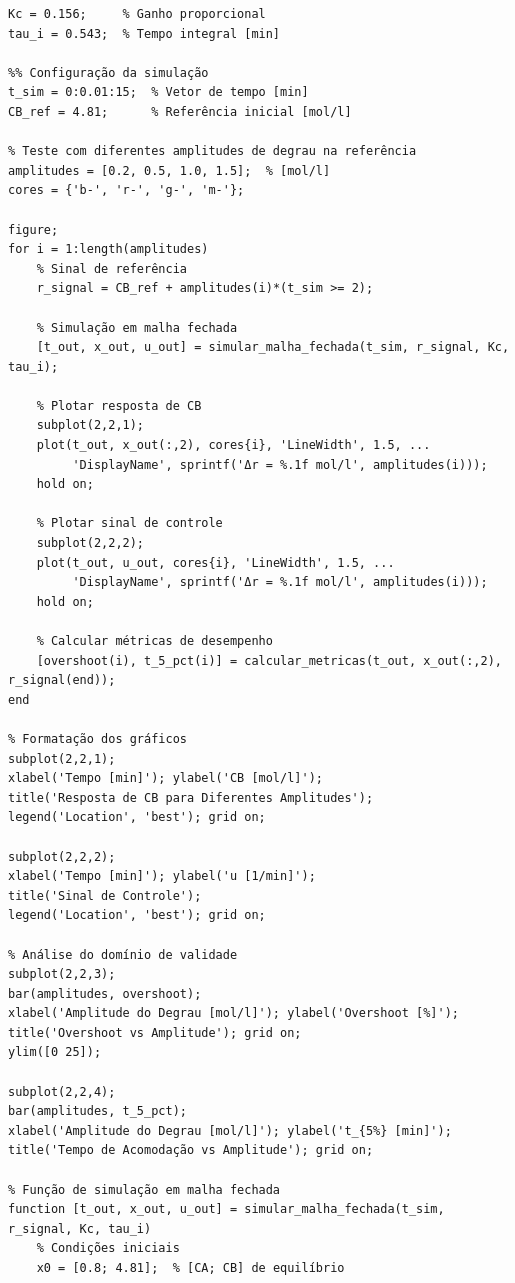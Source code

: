 \documentclass[a4paper,12pt]{article}
\begin{document}
\begin{lstlisting}[caption=Simulação do controle PI em sistema não linear]
%% Parâmetros do controlador PI projetado
Kc = 0.156;     % Ganho proporcional
tau_i = 0.543;  % Tempo integral [min]

%% Configuração da simulação
t_sim = 0:0.01:15;  % Vetor de tempo [min]
CB_ref = 4.81;      % Referência inicial [mol/l]

% Teste com diferentes amplitudes de degrau na referência
amplitudes = [0.2, 0.5, 1.0, 1.5];  % [mol/l]
cores = {'b-', 'r-', 'g-', 'm-'};

figure;
for i = 1:length(amplitudes)
    % Sinal de referência
    r_signal = CB_ref + amplitudes(i)*(t_sim >= 2);
    
    % Simulação em malha fechada
    [t_out, x_out, u_out] = simular_malha_fechada(t_sim, r_signal, Kc, tau_i);
    
    % Plotar resposta de CB
    subplot(2,2,1);
    plot(t_out, x_out(:,2), cores{i}, 'LineWidth', 1.5, ...
         'DisplayName', sprintf('Δr = %.1f mol/l', amplitudes(i)));
    hold on;
    
    % Plotar sinal de controle
    subplot(2,2,2);
    plot(t_out, u_out, cores{i}, 'LineWidth', 1.5, ...
         'DisplayName', sprintf('Δr = %.1f mol/l', amplitudes(i)));
    hold on;
    
    % Calcular métricas de desempenho
    [overshoot(i), t_5_pct(i)] = calcular_metricas(t_out, x_out(:,2), r_signal(end));
end

% Formatação dos gráficos
subplot(2,2,1);
xlabel('Tempo [min]'); ylabel('CB [mol/l]');
title('Resposta de CB para Diferentes Amplitudes');
legend('Location', 'best'); grid on;

subplot(2,2,2);
xlabel('Tempo [min]'); ylabel('u [1/min]');
title('Sinal de Controle'); 
legend('Location', 'best'); grid on;

% Análise do domínio de validade
subplot(2,2,3);
bar(amplitudes, overshoot);
xlabel('Amplitude do Degrau [mol/l]'); ylabel('Overshoot [%]');
title('Overshoot vs Amplitude'); grid on;
ylim([0 25]);

subplot(2,2,4);
bar(amplitudes, t_5_pct);
xlabel('Amplitude do Degrau [mol/l]'); ylabel('t_{5%} [min]');
title('Tempo de Acomodação vs Amplitude'); grid on;

% Função de simulação em malha fechada
function [t_out, x_out, u_out] = simular_malha_fechada(t_sim, r_signal, Kc, tau_i)
    % Condições iniciais
    x0 = [0.8; 4.81];  % [CA; CB] de equilíbrio
    

\end{lstlisting}
\end{document}

